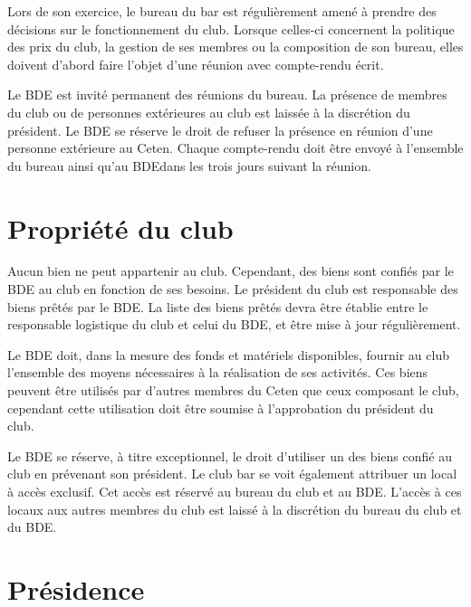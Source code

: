 \documentclass{article} %
\begin{document}
\begin{multicols}{2}
		{\small
		
			Lors de son exercice, le bureau du bar est régulièrement amené à
			prendre des décisions sur le fonctionnement du club. Lorsque
			celles-ci concernent la politique des prix du club, la gestion de
			ses membres ou la composition de son bureau, elles doivent d'abord
			faire l'objet d'une réunion avec compte-rendu écrit.

			Le BDE est invité permanent des réunions du bureau. La présence de
			membres du club ou de personnes extérieures au club est laissée à la
			discrétion du président. Le BDE se réserve le droit de refuser la
			présence en réunion d'une personne extérieure au Ceten. Chaque
			compte-rendu doit être envoyé à l'ensemble du bureau ainsi qu'au
			BDE\@ dans les trois jours suivant la réunion.
		
		}

		\section{Propriété du club}
\label{sec:propriete}
		
		{\small
		
			Aucun bien ne peut appartenir au club. Cependant, des biens sont
			confiés par le BDE au club en fonction de ses besoins. Le président
			du club est responsable des biens prêtés par le BDE\@. La liste des
			biens prêtés devra être établie entre le responsable logistique du
			club et celui du BDE, et être mise à jour régulièrement.

			Le BDE doit, dans la mesure des fonds et matériels disponibles,
			fournir au club l’ensemble des moyens nécessaires à la réalisation
			de ses activités. Ces biens peuvent être utilisés par d’autres
			membres du Ceten que ceux composant le club, cependant cette
			utilisation doit être soumise à l’approbation du président du club.

			Le BDE se réserve, à titre exceptionnel, le droit d’utiliser un des
			biens confié au club en prévenant son président. Le club bar se voit
			également attribuer un local à accès exclusif. Cet accès est réservé
			au bureau du club et au BDE\@. L’accès à ces locaux aux autres
			membres du club est laissé à la discrétion du bureau du club et du
			BDE\@.
			
		}

		\section{Présidence}
\label{sec:presidence}


\end{multicols}
\end{document}
